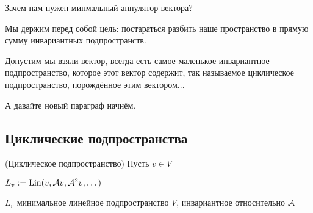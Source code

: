 \vspace*{5mm}

Зачем нам нужен минмальный аннулятор вектора?

Мы держим перед собой цель: постараться разбить наше пространство в прямую сумму инвариантных подпространств.

Допустим мы взяли вектор, всегда есть самое маленькое инвариантное подпространство,
которое этот вектор содержит, так называемое циклическое подпространство, порождённое этим вектором...

А давайте новый параграф начнём.

\subsection{Циклические подпространства}

\begin{conj}(Циклическое подпространство)
    Пусть $ v \in V  $

    $ L_v := \operatorname{Lin} (v, \mathcal{A} v, \mathcal{A}^2 v, \dots ) $

    $ L_v $  минимальное линейное подпространство $V$, инвариантное относительно $\mathcal{A}$

\end{conj}

